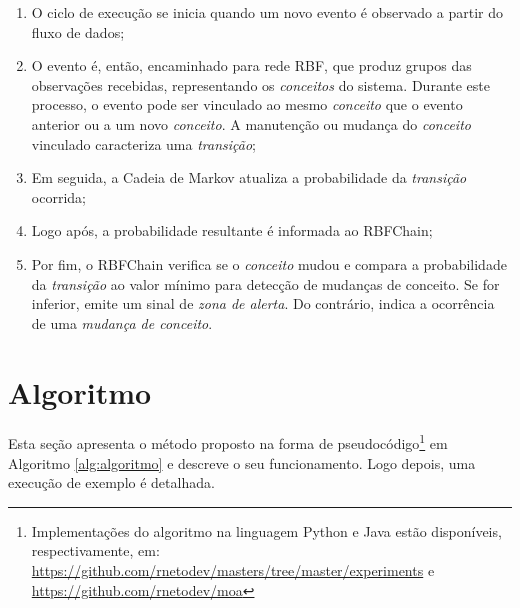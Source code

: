 \documentclass[msc, classic, a4paper]{ufbathesis}
\begin{document}
\begin{enumerate}
    \item O ciclo de execução se inicia quando um novo evento é observado a partir do fluxo de dados;
    
    \item O evento é, então, encaminhado para rede RBF, que produz grupos das observações recebidas, representando os \textit{conceitos} do sistema.
    Durante este processo, o evento pode ser vinculado ao mesmo \textit{conceito} que o evento anterior ou a um novo \textit{conceito}. 
    A manutenção ou mudança do \textit{conceito} vinculado caracteriza uma \textit{transição};
    
    \item Em seguida, a Cadeia de Markov atualiza a probabilidade da \textit{transição} ocorrida;
    
    \item Logo após, a probabilidade resultante é informada ao RBFChain;
    
    \item Por fim, o RBFChain verifica se o \textit{conceito} mudou e compara a probabilidade da \textit{transição} ao valor mínimo para detecção de mudanças de conceito. Se for inferior, emite um sinal de \textit{zona de alerta}. Do contrário, indica a ocorrência de uma \textit{mudança de conceito}.
\end{enumerate}

\section{Algoritmo}
\label{sec:rbfchain_detalhes}

Esta seção apresenta o método proposto na forma de pseudocódigo\footnote{Implementações do algoritmo na linguagem Python e Java estão disponíveis, respectivamente, em: \url{https://github.com/rnetodev/masters/tree/master/experiments} e \url{https://github.com/rnetodev/moa}} em Algoritmo \ref{alg:algoritmo} e descreve o seu funcionamento. 
Logo depois, uma execução de exemplo é detalhada.
\end{document}
